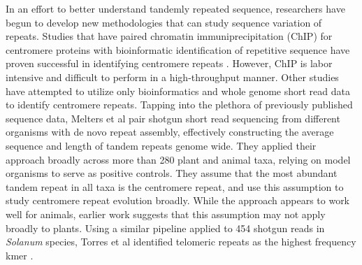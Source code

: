\documentclass[10pt,letterpaper]{article}
\begin{document}
In an effort to better understand tandemly repeated sequence, researchers have begun to develop new methodologies that can study sequence variation of repeats.
Studies that have paired chromatin immuniprecipitation (ChIP) for centromere proteins with bioinformatic identification of repetitive sequence have proven successful in identifying centromere repeats \cite{gong2012repeatless}.
However, ChIP is labor intensive and difficult to perform in a high-throughput manner.
Other studies have attempted to utilize only bioinformatics and whole genome short read data to identify centromere repeats.
Tapping into the plethora of previously published sequence data, Melters et al \cite{melters2013comparative} pair shotgun short read sequencing from different organisms with de novo repeat assembly, effectively constructing the average sequence and length of tandem repeats genome wide.
They applied their approach broadly across more than 280 plant and animal taxa, relying on model organisms to serve as positive controls.
They assume that the most abundant tandem repeat in all taxa is the centromere repeat, and use this assumption to study centromere repeat evolution broadly.
While the approach appears to work well for animals, earlier work suggests that this assumption may not apply broadly to plants.
Using a similar pipeline applied to 454 shotgun reads in \emph{Solanum} species, Torres et al identified telomeric repeats as the highest frequency kmer \cite{torres2011organization}.
\end{document}
